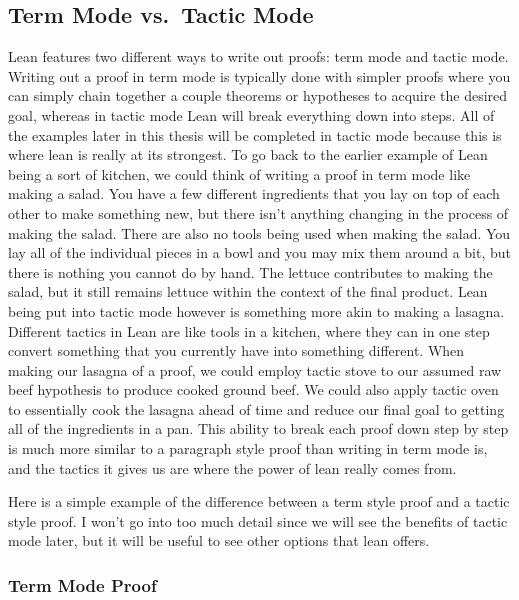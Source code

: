 \documentclass[
  letterpaper,
]{scrreprt}
\theoremstyle{remark}
\begin{document}
\hypertarget{term-mode-vs.-tactic-mode}{%
\subsection{Term Mode vs.~Tactic Mode}\label{term-mode-vs.-tactic-mode}}

Lean features two different ways to write out proofs: term mode and
tactic mode. Writing out a proof in term mode is typically done with
simpler proofs where you can simply chain together a couple theorems or
hypotheses to acquire the desired goal, whereas in tactic mode Lean will
break everything down into steps. All of the examples later in this
thesis will be completed in tactic mode because this is where lean is
really at its strongest. To go back to the earlier example of Lean being
a sort of kitchen, we could think of writing a proof in term mode like
making a salad. You have a few different ingredients that you lay on top
of each other to make something new, but there isn't anything changing
in the process of making the salad. There are also no tools being used
when making the salad. You lay all of the individual pieces in a bowl
and you may mix them around a bit, but there is nothing you cannot do by
hand. The lettuce contributes to making the salad, but it still remains
lettuce within the context of the final product. Lean being put into
tactic mode however is something more akin to making a lasagna.
Different tactics in Lean are like tools in a kitchen, where they can in
one step convert something that you currently have into something
different. When making our lasagna of a proof, we could employ tactic
stove to our assumed raw beef hypothesis to produce cooked ground beef.
We could also apply tactic oven to essentially cook the lasagna ahead of
time and reduce our final goal to getting all of the ingredients in a
pan. This ability to break each proof down step by step is much more
similar to a paragraph style proof than writing in term mode is, and the
tactics it gives us are where the power of lean really comes from.

Here is a simple example of the difference between a term style proof
and a tactic style proof. I won't go into too much detail since we will
see the benefits of tactic mode later, but it will be useful to see
other options that lean offers.

\hypertarget{term-mode-proof}{%
\subsubsection{Term Mode Proof}\label{term-mode-proof}}
\end{document}
